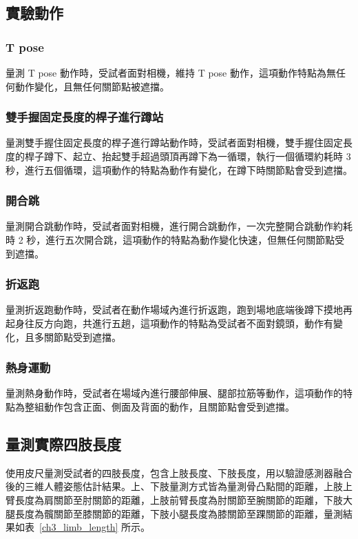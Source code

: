 \subsection{實驗動作}
\subsubsection*{T pose}
量測 T pose 動作時，受試者面對相機，維持 T pose 動作，這項動作特點為無任何動作變化，且無任何關節點被遮擋。
    
\subsubsection*{雙手握固定長度的桿子進行蹲站}
量測雙手握住固定長度的桿子進行蹲站動作時，受試者面對相機，雙手握住固定長度的桿子蹲下、起立、抬起雙手超過頭頂再蹲下為一循環，執行一個循環約耗時 3 秒，進行五個循環，這項動作的特點為動作有變化，在蹲下時關節點會受到遮擋。
    
\subsubsection*{開合跳}
量測開合跳動作時，受試者面對相機，進行開合跳動作，一次完整開合跳動作約耗時 2 秒，進行五次開合跳，這項動作的特點為動作變化快速，但無任何關節點受到遮擋。
    
\subsubsection*{折返跑}
量測折返跑動作時，受試者在動作場域內進行折返跑，跑到場地底端後蹲下摸地再起身往反方向跑，共進行五趟，這項動作的特點為受試者不面對鏡頭，動作有變化，且多關節點受到遮擋。
    
\subsubsection*{熱身運動}
量測熱身動作時，受試者在場域內進行腰部伸展、腿部拉筋等動作，這項動作的特點為整組動作包含正面、側面及背面的動作，且關節點會受到遮擋。
    

\subsection{量測實際四肢長度}
使用皮尺量測受試者的四肢長度，包含上肢長度、下肢長度，用以驗證感測器融合後的三維人體姿態估計結果。上、下肢量測方式皆為量測骨凸點間的距離，上肢上臂長度為肩關節至肘關節的距離，上肢前臂長度為肘關節至腕關節的距離，下肢大腿長度為髖關節至膝關節的距離，下肢小腿長度為膝關節至踝關節的距離，量測結果如表~\ref{ch3_limb_length} 所示。

